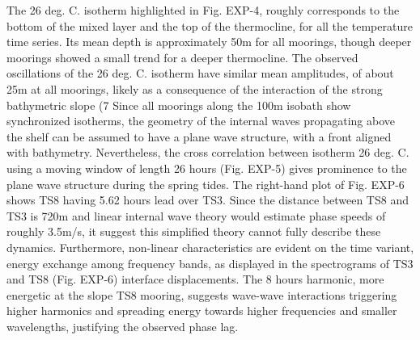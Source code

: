 The 26 deg. C. isotherm highlighted in Fig. EXP-4, roughly corresponds to the bottom of the mixed layer and the top of the thermocline, for all the temperature time series. Its mean depth is approximately 50m for all moorings, though deeper moorings showed a small trend for a deeper thermocline. The observed oscillations of the 26 deg. C. isotherm have similar mean amplitudes, of about 25m at all moorings, likely as a consequence of the interaction of the strong bathymetric slope (7%
Since all moorings along the 100m isobath show synchronized
isotherms, the geometry of the internal waves propagating above the
shelf can be assumed to have a plane wave structure, with a front
aligned with bathymetry. Nevertheless, the cross correlation between
isotherm 26 deg. C. using a moving window of length 26 hours (Fig.
EXP-5) gives prominence to the plane wave structure during the
spring tides. The right-hand plot of Fig. EXP-6 shows TS8 having
5.62 hours lead over TS3. Since the distance between TS8 and TS3 is
720m and linear internal wave theory would estimate phase speeds of
roughly 3.5m/s, it suggest this simplified theory cannot fully
describe these dynamics. Furthermore, non-linear characteristics are
evident on the time variant, energy exchange among frequency bands,
as displayed in the spectrograms of TS3 and TS8 (Fig. EXP-6)
interface displacements. The 8 hours harmonic, more energetic at the
slope TS8 mooring, suggests wave-wave interactions triggering higher
harmonics and spreading energy towards higher frequencies and
smaller wavelengths, justifying the observed phase lag.

